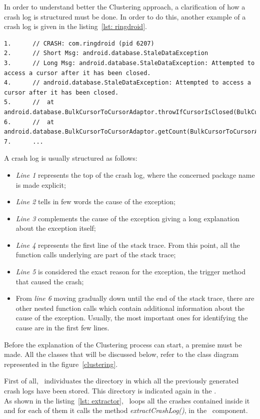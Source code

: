 In order to understand better the Clustering approach, a clarification of how a crash log is structured must be done. In order to do this, another example of a crash log is given in the listing~\ref{lst: ringdroid}. 
\begin{lstlisting}[caption=Structure of a crash log, basicstyle=\fontsize{6}{8}\ttfamily,label={lst: ringdroid}]
1.		// CRASH: com.ringdroid (pid 6207)
2.		// Short Msg: android.database.StaleDataException
3.		// Long Msg: android.database.StaleDataException: Attempted to access a cursor after it has been closed.
4.		// android.database.StaleDataException: Attempted to access a cursor after it has been closed.
5.		// 	at android.database.BulkCursorToCursorAdaptor.throwIfCursorIsClosed(BulkCursorToCursorAdaptor.java:64)
6. 		// 	at android.database.BulkCursorToCursorAdaptor.getCount(BulkCursorToCursorAdaptor.java:70)
7.		...
\end{lstlisting}
A crash log is usually structured as follows: 
\begin{itemize}
\item \textit{Line 1} represents the top of the crash log, where the concerned package name is made explicit;
\item \textit{Line 2} tells in few words the cause of the exception; 
\item \textit{Line 3} complements the cause of the exception giving a long explanation about the exception itself;
\item \textit{Line 4} represents the first line of the stack trace. From this point, all the function calls underlying are part of the stack trace;
\item \textit{Line 5} is considered the exact reason for the exception, \ie the trigger method that caused the crash;
\item From \textit{line 6} moving gradually down until the end of the stack trace, there are other nested function calls which contain additional information about the cause of the exception. Usually, the most important ones for identifying the cause are in the first few lines. 
\end{itemize}
Before the explanation of the Clustering process can start, a premise must be made. All the classes that will be discussed below, refer to the class diagram represented in the figure~\ref{clustering}. 


First of all, \toolname\ individuates the directory in which all the previously generated crash logs have been stored. This directory is indicated again in the \Config.\\  
As shown in the listing~\ref{lst: extractor}, \toolname\ loops all the crashes contained inside it and for each of them it calls the method \textit{extractCrashLog()}, in the \Extractor\ component. 

